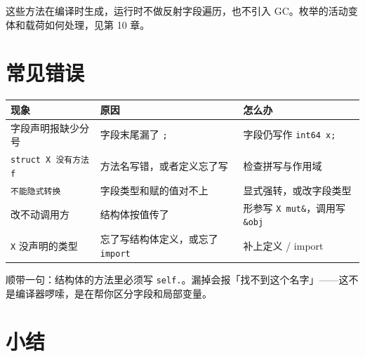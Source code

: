 这些方法在编译时生成，运行时不做反射字段遍历，也不引入 GC。枚举的活动变体和载荷如何处理，见第 10 章。

\section{常见错误}

\begin{center}
\begin{tabular}{lll}
\toprule
现象 & 原因 & 怎么办 \\
\midrule
字段声明报缺少分号 & 字段末尾漏了 \texttt{;} & 字段仍写作 \texttt{int64 x;} \\
\texttt{struct X 没有方法 f} & 方法名写错，或者定义忘了写 & 检查拼写与作用域 \\
\texttt{不能隐式转换} & 字段类型和赋的值对不上 & 显式强转，或改字段类型 \\
改不动调用方 & 结构体按值传了 & 形参写 \texttt{X mut\&}，调用写 \texttt{\&obj} \\
\texttt{X} 没声明的类型 & 忘了写结构体定义，或忘了 \texttt{import} & 补上定义 / import \\
\bottomrule
\end{tabular}
\end{center}

顺带一句：结构体的方法里必须写 \texttt{self.\allowbreak{}}。漏掉会报「找不到这个名字」——这不是编译器啰嗦，是在帮你区分字段和局部变量。

\section{小结}

